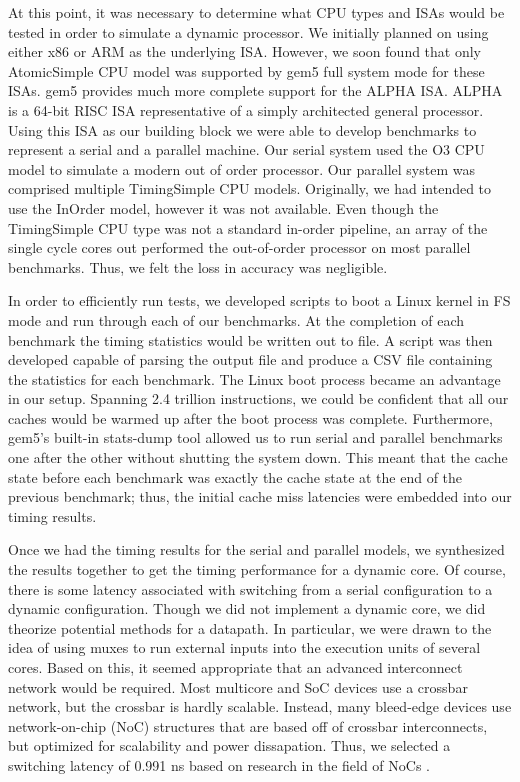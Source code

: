 At this point, it was necessary to determine what CPU types and ISAs would be tested in order to simulate a dynamic processor. We initially planned on using either x86 or ARM as the underlying ISA. However, we soon found that only AtomicSimple CPU model was supported by gem5 full system mode for these ISAs. gem5 provides much more complete support for the ALPHA ISA. ALPHA is a 64-bit RISC ISA representative of a simply architected general processor. Using this ISA as our building block we were able to develop benchmarks to represent a serial and a parallel machine. Our serial system used the O3 CPU model to simulate a modern out of order processor. Our parallel system was comprised multiple TimingSimple CPU models. Originally, we had intended to use the InOrder model, however it was not available. Even though the TimingSimple CPU type was not a standard in-order pipeline, an array of the single cycle cores out performed the out-of-order processor on most parallel benchmarks. Thus, we felt the loss in accuracy was negligible.

In order to efficiently run tests, we developed scripts to boot a Linux kernel in FS mode and run through each of our benchmarks. At the completion of each benchmark the timing statistics would be written out to file. A script was then developed capable of parsing the output file and produce a CSV file containing the statistics for each benchmark. The Linux boot process became an advantage in our setup. Spanning 2.4 trillion instructions, we could be confident that all our caches would be warmed up after the boot process was complete. Furthermore, gem5's built-in stats-dump tool allowed us to run serial and parallel benchmarks one after the other without shutting the system down. This meant that the cache state before each benchmark was exactly the cache state at the end of the previous benchmark; thus, the initial cache miss latencies were embedded into our timing results.

Once we had the timing results for the serial and parallel models, we synthesized the results together to get the timing performance for a dynamic core. Of course, there is some latency associated with switching from a serial configuration to a dynamic configuration. Though we did not implement a dynamic core, we did theorize potential methods for a datapath. In particular, we were drawn to the idea of using muxes to run external inputs into the execution units of several cores. Based on this, it seemed appropriate that an advanced interconnect network would be required. Most multicore and SoC devices use a crossbar network, but the crossbar is hardly scalable. Instead, many bleed-edge devices use network-on-chip (NoC) structures that are based off of crossbar interconnects, but optimized for scalability and power dissapation. Thus, we selected a switching latency of 0.991 ns based on research in the field of NoCs \cite{lee}.

